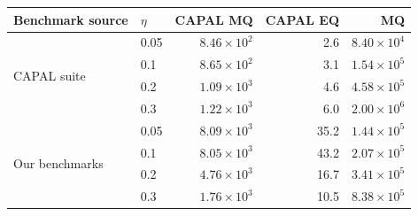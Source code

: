 \begin{tabular}{llrrr}
\toprule
Benchmark source & $\eta$ & CAPAL MQ & CAPAL EQ & \ours{} MQ \\
\midrule
\multirow{4}{*}{CAPAL suite} & 0.05 & $8.46 \times 10^{2}$ & 2.6 & $8.40 \times 10^{4}$ \\
 & 0.1 & $8.65 \times 10^{2}$ & 3.1 & $1.54 \times 10^{5}$ \\
 & 0.2 & $1.09 \times 10^{3}$ & 4.6 & $4.58 \times 10^{5}$ \\
 & 0.3 & $1.22 \times 10^{3}$ & 6.0 & $2.00 \times 10^{6}$ \\
\midrule
\multirow{4}{*}{Our benchmarks} & 0.05 & $8.09 \times 10^{3}$ & 35.2 & $1.44 \times 10^{5}$ \\
 & 0.1 & $8.05 \times 10^{3}$ & 43.2 & $2.07 \times 10^{5}$ \\
 & 0.2 & $4.76 \times 10^{3}$ & 16.7 & $3.41 \times 10^{5}$ \\
 & 0.3 & $1.76 \times 10^{3}$ & 10.5 & $8.38 \times 10^{5}$ \\
\bottomrule
\end{tabular}
